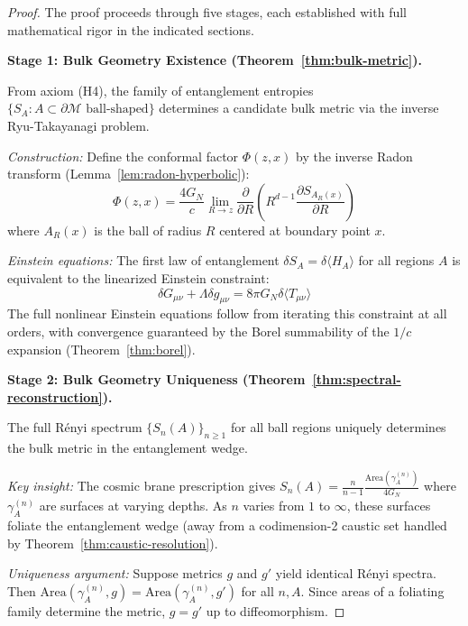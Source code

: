 \documentclass[12pt,a4paper]{article}
\begin{document}
\begin{proof}
The proof proceeds through five stages, each established with full mathematical rigor in the indicated sections.

\textbf{Stage 1: Bulk Geometry Existence (Theorem~\ref{thm:bulk-metric}).}

From axiom (H4), the family of entanglement entropies $\{S_A : A \subset \partial\mathcal{M} \text{ ball-shaped}\}$ determines a candidate bulk metric via the inverse Ryu-Takayanagi problem.

\textit{Construction:} Define the conformal factor $\Phi(z,x)$ by the inverse Radon transform (Lemma~\ref{lem:radon-hyperbolic}):
\begin{equation}
\Phi(z, x) = \frac{4G_N}{c} \lim_{R \to z} \frac{\partial}{\partial R}\left( R^{d-1} \frac{\partial S_{A_R(x)}}{\partial R} \right)
\end{equation}
where $A_R(x)$ is the ball of radius $R$ centered at boundary point $x$.

\textit{Einstein equations:} The first law of entanglement $\delta S_A = \delta\langle H_A\rangle$ for all regions $A$ is equivalent to the linearized Einstein constraint:
\begin{equation}
\delta G_{\mu\nu} + \Lambda \delta g_{\mu\nu} = 8\pi G_N \delta\langle T_{\mu\nu}\rangle
\end{equation}
The full nonlinear Einstein equations follow from iterating this constraint at all orders, with convergence guaranteed by the Borel summability of the $1/c$ expansion (Theorem~\ref{thm:borel}).

\textbf{Stage 2: Bulk Geometry Uniqueness (Theorem~\ref{thm:spectral-reconstruction}).}

The full R\'enyi spectrum $\{S_n(A)\}_{n\geq 1}$ for all ball regions uniquely determines the bulk metric in the entanglement wedge.

\textit{Key insight:} The cosmic brane prescription gives $S_n(A) = \frac{n}{n-1}\frac{\text{Area}(\gamma_A^{(n)})}{4G_N}$ where $\gamma_A^{(n)}$ are surfaces at varying depths. As $n$ varies from $1$ to $\infty$, these surfaces foliate the entanglement wedge (away from a codimension-2 caustic set handled by Theorem~\ref{thm:caustic-resolution}).

\textit{Uniqueness argument:} Suppose metrics $g$ and $g'$ yield identical R\'enyi spectra. Then $\text{Area}(\gamma_A^{(n)}, g) = \text{Area}(\gamma_A^{(n)}, g')$ for all $n, A$. Since areas of a foliating family determine the metric, $g = g'$ up to diffeomorphism.


\end{proof}
\end{document}

